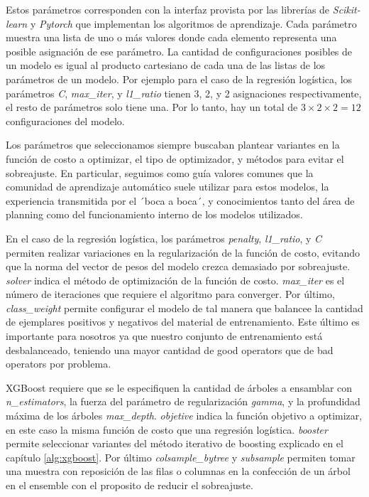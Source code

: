 Estos parámetros corresponden con la interfaz provista por las librerías de
\emph{Scikit-learn} y \emph{Pytorch} que implementan los algoritmos de
aprendizaje. Cada parámetro muestra una lista de uno o más valores donde cada
elemento representa una posible asignación de ese parámetro. La cantidad de
configuraciones posibles de un modelo es igual al producto cartesiano de cada
una de las listas de los parámetros de un modelo. Por ejemplo para el caso de la
regresión logística, los parámetros \emph{C}, \emph{max\_iter}, y
\emph{l1\_ratio} tienen 3, 2, y 2 asignaciones respectivamente, el resto de
parámetros solo tiene una. Por lo tanto, hay un total de $3 \times 2 \times 2 =
12$ configuraciones del modelo.

Los parámetros que seleccionamos siempre buscaban plantear variantes en la
función de costo a optimizar, el tipo de optimizador, y métodos para evitar el
sobreajuste. En particular, seguimos como guía valores comunes que la comunidad
de aprendizaje automático suele utilizar para estos modelos,  la experiencia
transmitida por el ´boca a boca´, y conocimientos tanto del área de planning
como del funcionamiento interno de los modelos utilizados. 

En el caso de la regresión logística, los parámetros \emph{penalty},
\emph{l1\_ratio}, y \emph{C} permiten realizar variaciones en la regularización
de la función de costo, evitando que la norma del vector de pesos del modelo
crezca demasiado por sobreajuste. \emph{solver} indica el método de optimización
de la función de costo. \emph{max\_iter} es el número de iteraciones que
requiere el algoritmo para converger. Por último, \emph{class\_weight} permite
configurar el modelo de tal manera que balancee la cantidad de ejemplares
positivos y negativos del material de entrenamiento. Este último es importante
para nosotros ya que nuestro conjunto de entrenamiento está desbalanceado,
teniendo una mayor cantidad de good operators que de bad operators por problema.

XGBoost requiere que se le especifiquen la cantidad de árboles a ensamblar con
\emph{n\_estimators}, la fuerza del parámetro de regularización \emph{gamma}, y
la profundidad máxima de los árboles \emph{max\_depth}. \emph{objetive} indica
la función objetivo a optimizar, en este caso la misma función de costo que una
regresión logística. \emph{booster} permite seleccionar variantes del método
iterativo de boosting explicado en el capítulo \ref{alg:xgboost}. Por último
\emph{colsample\_bytree} y \emph{subsample} permiten tomar una muestra con
reposición de las filas o columnas en la confección de un árbol en el ensemble
con el proposito de reducir el sobreajuste.

